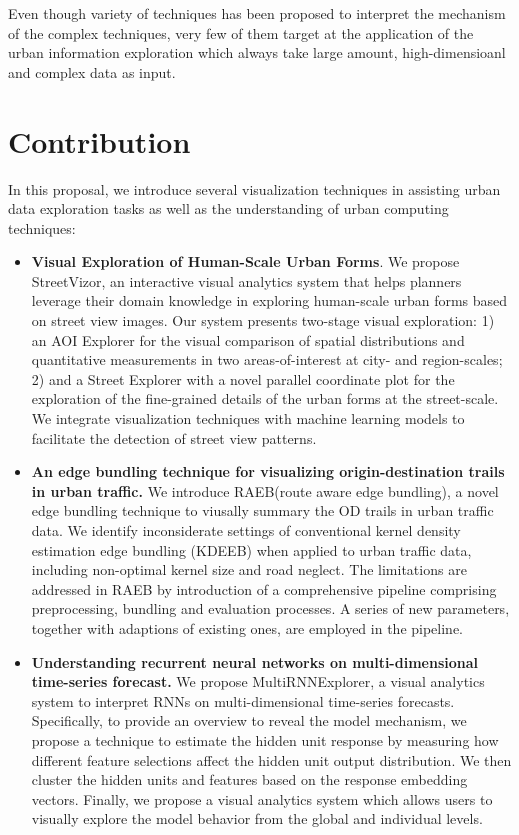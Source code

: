 Even though variety of techniques has been proposed to interpret the mechanism of the complex techniques, very few of them target at the application of the urban information exploration which always take large amount, high-dimensioanl and complex data as input.  

\section{Contribution}
In this proposal, we introduce several visualization techniques in assisting urban data exploration tasks as well as the understanding of urban computing techniques:

\begin{itemize}[noitemsep]
	\item \textbf{Visual Exploration of Human-Scale Urban Forms}. We propose StreetVizor, an interactive visual analytics system that helps planners leverage their domain knowledge in exploring human-scale urban forms based on street view images. Our system presents two-stage visual exploration: 1) an AOI Explorer for the visual comparison of spatial distributions and quantitative measurements in two areas-of-interest at city- and region-scales; 2) and a Street Explorer with a novel parallel coordinate plot for the exploration of the fine-grained details of the urban forms at the street-scale. We integrate visualization techniques with machine learning models to facilitate the detection of street view patterns. 
	\item \textbf{An edge bundling technique for visualizing origin-destination trails in urban traffic.} We introduce RAEB(route aware edge bundling), a novel edge bundling technique to viusally summary the OD trails in urban traffic data. We identify inconsiderate settings of conventional kernel density estimation edge bundling (KDEEB) when applied to urban traffic data, including non-optimal kernel size and road neglect. The limitations are addressed in RAEB by introduction of a comprehensive pipeline comprising preprocessing, bundling and evaluation processes. A series of new parameters, together with adaptions of existing ones, are employed in the pipeline. 
	\item \textbf{Understanding recurrent neural networks on multi-dimensional time-series forecast.} We propose MultiRNNExplorer, a visual analytics system to interpret RNNs on multi-dimensional time-series forecasts.  
	Specifically, to provide an overview to reveal the model mechanism, we propose a technique to estimate the hidden unit response by measuring how different feature selections affect the hidden unit output distribution. 
	We then cluster the hidden units and features based on the response embedding vectors. 
	Finally, we propose a visual analytics system which allows users to visually explore the model behavior from the global and individual levels.
\end{itemize}



